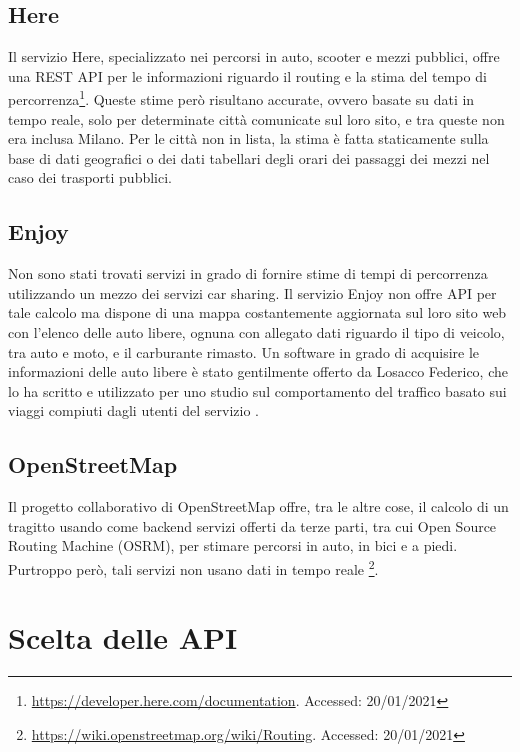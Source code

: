 \subsection{Here}

Il servizio Here, specializzato nei percorsi in auto, scooter e mezzi pubblici, offre una REST API per le informazioni riguardo il routing e la stima del tempo di percorrenza\footnote{\url{https://developer.here.com/documentation}. Accessed: 20/01/2021}. Queste stime però risultano accurate, ovvero basate su dati in tempo reale, solo per determinate città comunicate sul loro sito, e tra queste non era inclusa Milano. Per le città non in lista, la stima è fatta staticamente sulla base di dati geografici o dei dati tabellari degli orari dei passaggi dei mezzi nel caso dei trasporti pubblici.

\subsection{Enjoy}

Non sono stati trovati servizi in grado di fornire stime di tempi di percorrenza utilizzando un mezzo dei servizi car sharing. Il servizio Enjoy non offre API per tale calcolo ma dispone di una mappa costantemente aggiornata sul loro sito web con l'elenco delle auto libere, ognuna con allegato dati riguardo il tipo di veicolo, tra auto e moto, e il carburante rimasto. Un software in grado di acquisire le informazioni delle auto libere è stato gentilmente offerto da Losacco Federico, che lo ha scritto e utilizzato per uno studio sul comportamento del traffico basato sui viaggi compiuti dagli utenti del servizio \cite{trentini2017sampling}.

\subsection{OpenStreetMap}

Il progetto collaborativo di OpenStreetMap offre, tra le altre cose, il calcolo di un tragitto usando come backend servizi offerti da terze parti, tra cui Open Source Routing Machine (OSRM), per stimare percorsi in auto, in bici e a piedi. Purtroppo però, tali servizi non usano dati in tempo reale \footnote{\url{https://wiki.openstreetmap.org/wiki/Routing}. Accessed: 20/01/2021}.

\section{Scelta delle API}

